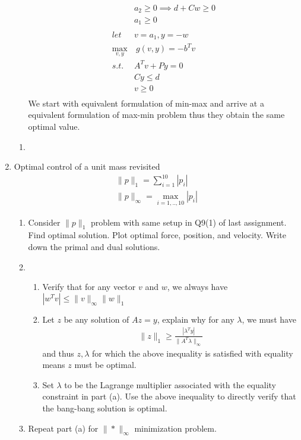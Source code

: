 \documentclass[12pt,letter]{article}
\newcommand{\norm}[1]{\|#1\|}
\begin{document}
\begin{enumerate}
\begin{enumerate}
\begin{align*}
                      &a_2 \geq 0 \implies d+Cw \geq 0\\
                      &a_1 \geq 0\\
      \\
      let\ &v = a_1, y = -w\\
      \max_{v,y}&\ g(v,y) = -b^Tv\\
      s.t.\ &A^Tv+Py=0\\
                      &Cy \leq d\\
                      &v \geq 0\\
    \end{align*}
    We start with equivalent formulation of min-max and arrive at a equivalent formulation of max-min problem thus they obtain the same optimal value.
  \end{enumerate}
  \begin{enumerate}
  \item 
  \end{enumerate}
  \pagebreak
  
\item Optimal control of a unit mass revisited\\
  \begin{align*}
    \norm{p}_1 = \sum_{i=1}^{10} |p_i|\\
    \norm{p}_{\infty} = \max_{i=1,..,10} |p_i|
  \end{align*}
  \begin{enumerate}
  \item Consider $\norm{p}_1$ problem with same setup in Q9(1) of last assignment. Find optimal solution. Plot optimal force, position, and velocity. Write down the primal and dual solutions.
  \item
    \begin{enumerate}
    \item Verify that for any vector $v$ and $w$, we always have $|w^Tv| \leq \norm{v}_{\infty} \norm{w}_1$
    \item Let $z$ be any solution of $Az=y$, explain why for any $\lambda$, we must have
      \begin{align*}
        \norm{z}_1 \geq \frac{|\lambda^Ty|}{\norm{A^T\lambda}_{\infty}}
      \end{align*}
      and thus $z,\lambda$ for which the above inequality is satisfied with equality means $z$ must be optimal.
    \item Set $\lambda$ to be the Lagrange multiplier associated with the equality constraint in part (a). Use the above inequality to directly verify that the bang-bang solution is optimal.
    \end{enumerate}
  \item Repeat part (a) for $\norm{\ast}_{\infty}$ minimization problem.
  \end{enumerate}
  
\end{enumerate}
\end{document}
